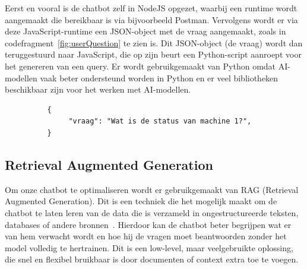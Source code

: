 Eerst en vooral is de chatbot zelf in NodeJS opgezet, waarbij een runtime wordt aangemaakt die bereikbaar is via bijvoorbeeld Postman.
Vervolgens wordt er via deze JavaScript-runtime een JSON-object met de vraag aangemaakt, zoals in codefragment~\ref{fig:userQuestion} te zien is.
Dit JSON-object (de vraag) wordt dan teruggestuurd naar JavaScript, die op zijn beurt een Python-script aanroept voor het genereren van een query.
Er wordt gebruikgemaakt van Python omdat AI-modellen vaak beter ondersteund worden in Python en er veel bibliotheken beschikbaar zijn voor het werken met AI-modellen.

\begin{listing}[H]
     \begin{verbatim}
          {
               "vraag": "Wat is de status van machine 1?",
          }
     \end{verbatim}
     \caption[Voorbeeld JSON vraag]{\label{fig:userQuestion}Voorbeeld van vraag in JSON.}
\end{listing}

\subsection{Retrieval Augmented Generation}
Om onze chatbot te optimaliseren wordt er gebruikgemaakt van RAG (Retrieval Augmented Generation).
Dit is een techniek die het mogelijk maakt om de chatbot te laten leren van de data die is verzameld in ongestructureerde teksten, databases of andere bronnen~\autocite{Zeichick2023}.
Hierdoor kan de chatbot beter begrijpen wat er van hem verwacht wordt en hoe hij de vragen moet beantwoorden zonder het model volledig te hertrainen.
Dit is een low-level, maar veelgebruikte oplossing, die snel en flexibel bruikbaar is door documenten of context extra toe te voegen.

